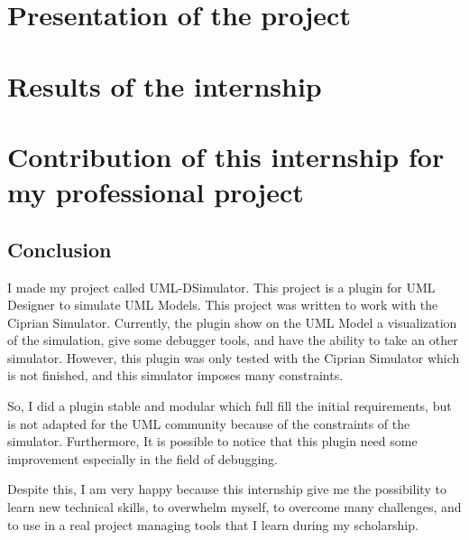 \documentclass[a4paper, 11pt, oneside, oldfontcommands]{memoir}
\newcounter{rem}[chapter]
\newcounter{th}[chapter]
\newcommand{\umld}{UML Designer\xspace}
\begin{document}



\part{Presentation of the project}





\part{Results of the internship}






% 


\part{Contribution of this internship for my professional project}



\chapter*{Conclusion}

I made my project called UML-DSimulator. This project is a plugin for \umld to simulate UML Models.
This project was written to work with the Ciprian Simulator. Currently, the plugin show on the UML Model a visualization of the simulation, give some debugger tools, and have the ability to take an other simulator. However, this plugin was only tested with the Ciprian Simulator which is not finished, and this simulator imposes many constraints. %

So, I did a plugin stable and modular which full fill the initial requirements, but is not adapted for the UML community because of the constraints of the simulator. Furthermore, It is possible to notice that this plugin need some improvement especially in the field of debugging.

Despite this, I am very happy because this internship give me the possibility to learn new technical skills, to overwhelm myself, to overcome many challenges, and to use in a real project managing tools that I learn during my scholarship. %
\newpage
\end{document}
